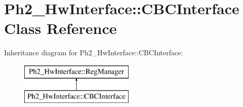 \hypertarget{class_ph2___hw_interface_1_1_c_b_c_interface}{\section{Ph2\-\_\-\-Hw\-Interface\-:\-:C\-B\-C\-Interface Class Reference}
\label{class_ph2___hw_interface_1_1_c_b_c_interface}
}
Inheritance diagram for Ph2\-\_\-\-Hw\-Interface\-:\-:C\-B\-C\-Interface\-:\begin{figure}[H]
\begin{center}
\leavevmode
\includegraphics[height=2.000000cm]{class_ph2___hw_interface_1_1_c_b_c_interface}
\end{center}
\end{figure}

